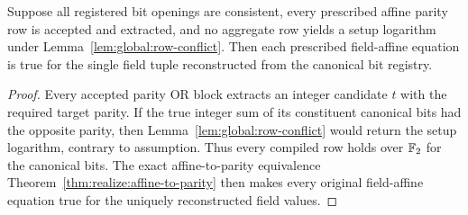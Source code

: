 \begin{lemma}\label{lem:global:all-affine}
Suppose all registered bit openings
are consistent, every prescribed affine
parity row is accepted and extracted,
and no aggregate row yields a setup
logarithm under
Lemma~\ref{lem:global:row-conflict}.
Then each prescribed field-affine
equation is true for the single
field tuple reconstructed from
the canonical bit registry.
\end{lemma}
\begin{proof}
Every accepted parity OR block
extracts an integer candidate
$t$ with the required target
parity. If the true integer sum
of its constituent canonical bits
had the opposite parity, then
Lemma~\ref{lem:global:row-conflict}
would return the setup logarithm,
contrary to assumption.
Thus every compiled row holds
over $\mathbb{F}_2$ for the canonical bits.
The exact affine-to-parity
equivalence
Theorem~\ref{thm:realize:affine-to-parity}
then makes every original
field-affine equation true for
the uniquely reconstructed
field values.
\end{proof}

